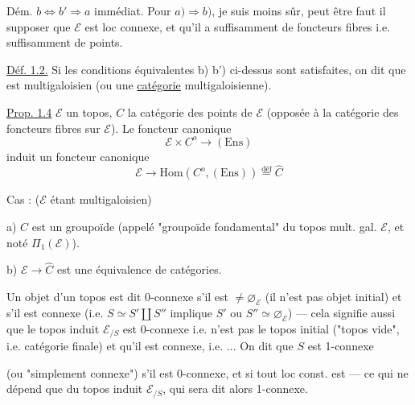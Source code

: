 Dém. \(b\Longleftrightarrow b'\Longrightarrow a\) immédiat.
Pour \(a)\Longrightarrow b)\), je suis moins sûr, peut être faut il
supposer que \(\mathcal E\) est loc connexe, et qu'il a suffisamment
de foncteurs fibres i.e. suffisamment de points.

\uline{Déf. 1.2.} Si les conditions équivalentes b) b') ci-dessus
sont satisfaites, on dit que 
est   
multigaloisien (ou une \uline{catégorie} multigaloisienne).


\uline{Prop. 1.4}  \(\mathcal E\) un topos,
\(C\) la catégorie des points de \(\mathcal E\) (opposée à la
catégorie des foncteurs fibres sur \(\mathcal E\)). Le foncteur
canonique
\[
\mathcal E\times C^o\longrightarrow(\mathrm{Ens})
\]
induit un foncteur canonique
\[
\mathcal E\longrightarrow\mathrm{Hom}(C^o,(\mathrm{Ens}))
\overset{\mathrm{déf}}{=}\widehat C
\]

Cas  : (\(\mathcal E\) étant multigaloisien)

a) \(C\) est un groupoïde (appelé "groupoïde fondamental" du topos
mult. gal. \(\mathcal E\), et  noté
\(\Pi_1(\mathcal E)\)).

b) \(\mathcal E\longrightarrow\widehat C\) est une équivalence
de catégories.

Un objet  d'un topos 
est dit 0-connexe s'il est \(\ne\varnothing_{\mathcal E}\)
(il n'est pas objet initial) et s'il est connexe
(i.e. \(S\simeq S'\amalg S''\) implique
\(S'\) ou \(S''\simeq\varnothing_{\mathcal E}\)) --- cela signifie
aussi que le topos induit \(\mathcal E_{/S}\) est 0-connexe
i.e. n'est pas le topos initial ("topos vide", i.e.
 catégorie finale) et qu'il est connexe,
i.e. ... On dit que \(S\) est 1-connexe


(ou "simplement connexe") s'il est 0-connexe, et si tout
loc const.  est 
--- ce qui ne dépend  que du topos induit
\(\mathcal E_{/S}\), qui sera dit alors 1-connexe.

